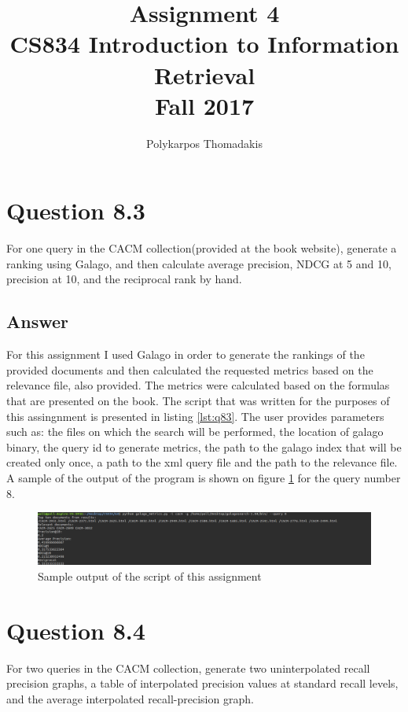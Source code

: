 \documentclass{article}
\author{Polykarpos Thomadakis}
\title{Assignment 4 \\
	\large CS834 Introduction to Information Retrieval\\Fall 2017}
\begin{document}
	\maketitle
	\section*{Question 8.3}
	For one query in the CACM collection(provided at the book website), generate a ranking using Galago, and then calculate average precision, NDCG at 5 and 10, precision at 10, and the reciprocal rank by hand.
	\subsection*{Answer}
	For this assignment I used Galago in order to generate the rankings of the provided documents and then calculated the requested metrics based on the relevance file, also provided. The metrics were calculated based on the formulas that are presented on the book.
	The script that was written for the purposes of this assingnment is presented in listing \ref{lst:q83}. The user provides parameters such as: the files on which the search will be performed, the location of galago binary, the query id to generate metrics, the path to the galago index that will be created only once, a path to the xml query file and the path to the relevance file.
	A sample of the output of the program is shown on figure \ref{fig:q83} for the query number 8.
	
	\begin{figure}[h]
		\includegraphics[width=\linewidth]{q83.png}
		\caption{Sample output of the script of this assignment}
		\label{fig:q83}
	\end{figure}
	\section*{Question 8.4}
	For two queries in the CACM collection, generate two uninterpolated recall precision graphs, a table of interpolated precision values at standard recall levels, and the average interpolated recall-precision graph.
\end{document}
